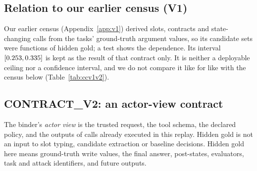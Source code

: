 \documentclass{article}
\begin{document}
\subsection{Relation to our earlier census (V1)}
\label{sec:v1}
Our earlier census (Appendix~\ref{app:v1}) derived slots, contracts and
state-changing calls from the tasks' ground-truth argument values, so its
candidate sets were functions of hidden gold; a test shows the dependence.
Its interval $[0.253,0.335]$ is kept as the result of that contract
only. It is neither a deployable ceiling nor a confidence interval, and we
do not compare it like for like with the census below
(Table~\ref{tab:ccv1v2}).

\subsection{CONTRACT\_V2: an actor-view contract}
\label{sec:v2}
The binder's \emph{actor view} is the trusted request, the tool schema, the
declared policy, and the outputs of calls already executed in this replay.
Hidden gold is not an input to slot typing, candidate extraction or
baseline decisions. Hidden gold here means ground-truth write values, the
final answer, post-states, evaluators, task and attack identifiers, and
future outputs.
\end{document}
